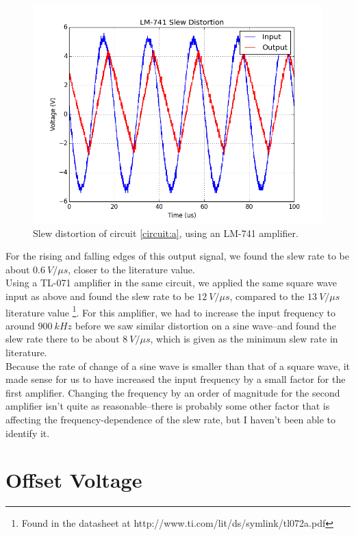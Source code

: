 \documentclass[11pt]{article}
\begin{document}
\begin{figure}[H]
    \centering
    \includegraphics[scale=0.6]{Plots/figA-2.png}
    \caption{Slew distortion of circuit \ref{circuit:a}, using an LM-741 amplifier.}
    \label{fig:A-2}
\end{figure}

For the rising and falling edges of this output signal, we found the slew rate to be about $0.6\ V / \mu s$, closer to the literature value.\\

Using a TL-071 amplifier in the same circuit, we applied the same square wave input as above and found the slew rate to be $12\ V / \mu s$, compared to the $13\ V / \mu s$ literature value \footnote{Found in the datasheet at http://www.ti.com/lit/ds/symlink/tl072a.pdf}. For this amplifier, we had to increase the input frequency to around $900\ kHz$ before we saw similar distortion on a sine wave--and found the slew rate there to be about $8\ V / \mu s$, which is given as the minimum slew rate in literature.\\

Because the rate of change of a sine wave is smaller than that of a square wave, it made sense for us to have increased the input frequency by a small factor for the first amplifier. Changing the frequency by an order of magnitude for the second amplifier isn't quite as reasonable--there is probably some other factor that is affecting the frequency-dependence of the slew rate, but I haven't been able to identify it.\\


\section{Offset Voltage}
\end{document}
